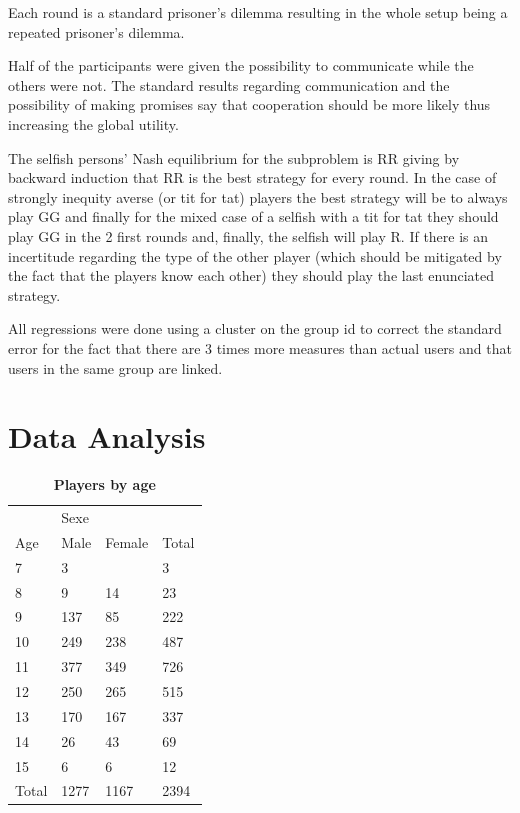 \documentclass{article} %
\begin{document}
Each round is a standard prisoner's dilemma resulting in the whole setup being a repeated prisoner's dilemma. 

Half of the participants were given the possibility to communicate while the others were not. The standard results regarding communication and the possibility of making promises say that cooperation should be more likely thus increasing the global utility.

The selfish persons' Nash equilibrium for the subproblem is RR giving by backward induction that RR is the best strategy for every round. In the case of strongly inequity averse (or tit for tat) players the best strategy will be to always play GG and finally for the mixed case of a selfish with a tit for tat they should play GG in the 2 first rounds and, finally, the selfish will play R. If there is an incertitude regarding the type of the other player (which should be mitigated by the fact that the players know each other) they should play the last enunciated strategy.

All regressions were done using a cluster on the group id to correct the standard error for the fact that there are 3 times more measures than actual users and that users in the same group are linked.
\section{Data Analysis}

\begin{table}[H]
\centering
\caption{\label{}\textbf{Players by age}}
\begin{tabular}{l|lll}
\hline
      & Sexe &        &       \\
Age   & Male & Female & Total \\ \hline
7     & 3    &        & 3     \\
8     & 9    & 14     & 23    \\
9     & 137  & 85     & 222   \\
10    & 249  & 238    & 487   \\
11    & 377  & 349    & 726   \\
12    & 250  & 265    & 515   \\
13    & 170  & 167    & 337   \\
14    & 26   & 43     & 69    \\
15    & 6    & 6      & 12    \\ \hline
Total & 1277 & 1167   & 2394  \\ \hline
\end{tabular}
\end{table}
\end{document}
